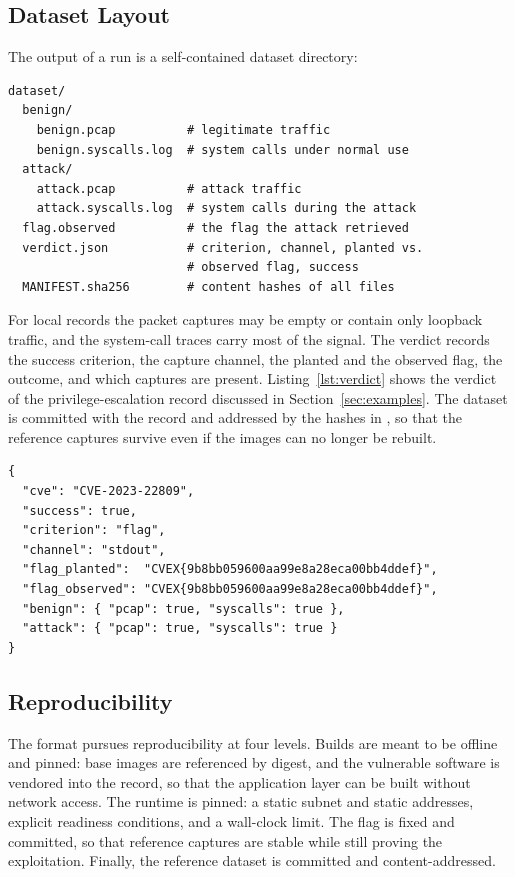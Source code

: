 \subsection{Dataset Layout}
\label{sec:dataset}

The output of a run is a self-contained dataset directory:

\begin{lstlisting}
dataset/
  benign/
    benign.pcap          # legitimate traffic
    benign.syscalls.log  # system calls under normal use
  attack/
    attack.pcap          # attack traffic
    attack.syscalls.log  # system calls during the attack
  flag.observed          # the flag the attack retrieved
  verdict.json           # criterion, channel, planted vs.
                         # observed flag, success
  MANIFEST.sha256        # content hashes of all files
\end{lstlisting}

For local records the packet captures may be empty or contain only loopback
traffic, and the system-call traces carry most of the signal. The verdict
records the success criterion, the capture channel, the planted and the
observed flag, the outcome, and which captures are present.
Listing~\ref{lst:verdict} shows the verdict of the privilege-escalation
record discussed in Section~\ref{sec:examples}. The dataset is committed with
the record and addressed by the hashes in , so that the
reference captures survive even if the images can no longer be rebuilt.

\begin{lstlisting}[float=t,caption={The \file{verdict.json} of a functional record.},label={lst:verdict}]
{
  "cve": "CVE-2023-22809",
  "success": true,
  "criterion": "flag",
  "channel": "stdout",
  "flag_planted":  "CVEX{9b8bb059600aa99e8a28eca00bb4ddef}",
  "flag_observed": "CVEX{9b8bb059600aa99e8a28eca00bb4ddef}",
  "benign": { "pcap": true, "syscalls": true },
  "attack": { "pcap": true, "syscalls": true }
}
\end{lstlisting}

\subsection{Reproducibility}

The format pursues reproducibility at four levels. Builds are meant to be
offline and pinned: base images are referenced by digest, and the vulnerable
software is vendored into the record, so that the application layer can be
built without network access. The runtime is pinned: a static subnet and
static addresses, explicit readiness conditions, and a wall-clock limit. The
flag is fixed and committed, so that reference captures are stable while
still proving the exploitation. Finally, the reference dataset is committed
and content-addressed.

